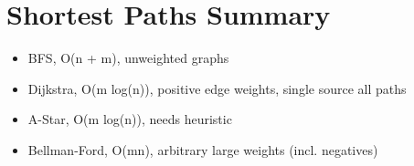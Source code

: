 \documentclass[10pt]{article}
\begin{document}
\section*{Shortest Paths Summary}
\begin{itemize}
	\item BFS, O(n + m), unweighted graphs
	\item Dijkstra, O(m log(n)), positive edge weights, single source all paths
	\item A-Star, O(m log(n)), needs heuristic
	\item Bellman-Ford, O(mn), arbitrary large weights (incl. negatives)
\end{itemize}
\end{document}
